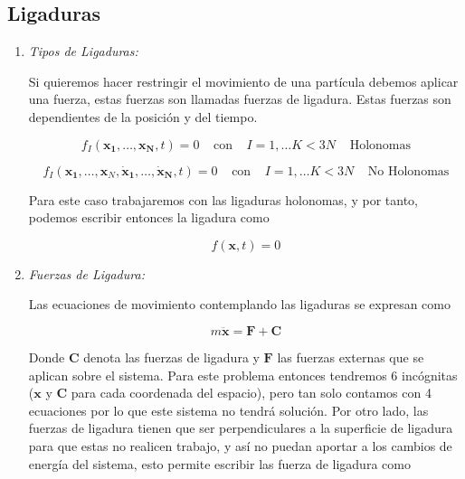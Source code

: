 \subsection[short]{Ligaduras}
    \begin{enumerate}
        \item \textit{Tipos de Ligaduras:}
            
            Si quieremos hacer restringir el movimiento de una partícula debemos aplicar una fuerza, estas fuerzas son llamadas fuerzas de ligadura. Estas fuerzas son dependientes de la posición y del tiempo.

            \begin{equation*}
                f_I (\mathbf{x_1}, \dots, \mathbf{x_N},t) = 0 \;\;\;\; \text{con} \;\;\;\; I = 1, \dots K < 3N \;\;\;\;\text{Holonomas}
            \end{equation*}

            \begin{equation*}
                f_I (\mathbf{x_1}, \dots, \mathbf{x}_N,\mathbf{\dot{x}_1}, \dots, \mathbf{\dot{x}_N},t) = 0 \;\;\;\; \text{con} \;\;\;\; I = 1, \dots K < 3N \;\;\;\;\text{No Holonomas}
            \end{equation*}

            Para este caso trabajaremos con las ligaduras holonomas, y por tanto, podemos escribir entonces la ligadura como

            \begin{equation*}
                f(\mathbf{x},t) = 0
            \end{equation*}

        \item \textit{Fuerzas de Ligadura:}

            Las ecuaciones de movimiento contemplando las ligaduras se expresan como

            \begin{equation*}
                m\ddot{\mathbf{x}} = \mathbf{F} + \mathbf{C}
            \end{equation*}

            Donde $\mathbf{C}$ denota las fuerzas de ligadura y $\mathbf{F}$ las fuerzas externas que se aplican sobre el sistema. Para este problema entonces tendremos 6 incógnitas ($\mathbf{x}$ y $\mathbf{C}$ para cada coordenada del espacio), pero tan solo contamos con 4 ecuaciones por lo que este sistema no tendrá solución. Por otro lado, las fuerzas de ligadura tienen que ser perpendiculares a la superficie de ligadura para que estas no realicen trabajo, y así no puedan aportar a los cambios de energía del sistema, esto permite escribir las fuerza de ligadura como


\end{enumerate}
